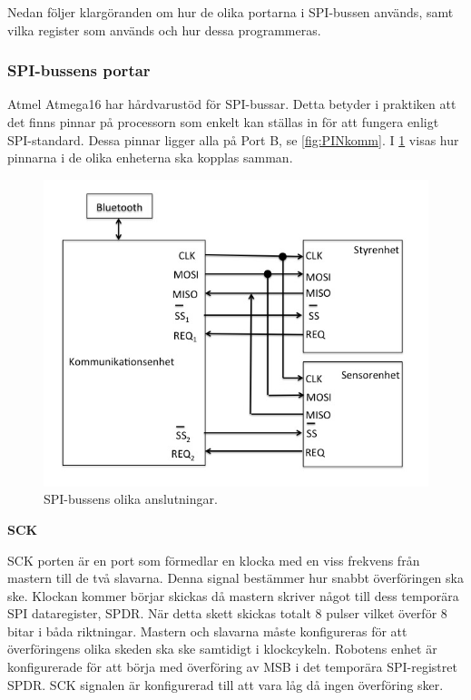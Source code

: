Nedan följer klargöranden om hur de olika portarna i SPI-bussen används, samt 
vilka register som används och hur dessa programmeras. 

\subsubsection{SPI-bussens portar}

Atmel Atmega16 har hårdvarustöd för SPI-bussar. Detta betyder i praktiken att 
det finns pinnar på processorn som enkelt kan ställas in för att fungera 
enligt SPI-standard. Dessa pinnar ligger alla på Port B, se \ref{fig:PINkomm}.
I \ref{fig:spibuss} visas hur pinnarna i de olika enheterna ska kopplas samman.

\begin{figure}[H]
  \centering
 \includegraphics[angle=0,scale=0.5]{bilder/SPI-buss.png}
  \caption{SPI-bussens olika anslutningar. }
  \label{fig:spibuss}
\end{figure}


\bf{SCK}

SCK porten är en port som förmedlar en klocka med en viss frekvens från 
mastern till de två slavarna. Denna signal bestämmer hur snabbt överföringen 
ska ske. Klockan kommer börjar skickas då mastern skriver något till dess 
temporära SPI dataregister, SPDR. När detta skett skickas totalt 8 pulser 
vilket överför 8 bitar i båda riktningar. Mastern och slavarna måste 
konfigureras för att överföringens olika skeden ska ske samtidigt i 
klockcykeln. Robotens enhet är konfigurerade för att börja med överföring av 
MSB i det temporära SPI-registret SPDR. SCK signalen är konfigurerad till att 
vara låg då ingen överföring sker.

